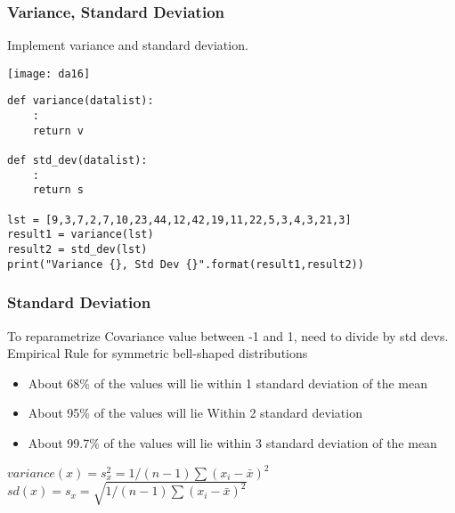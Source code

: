 \begin{frame}[fragile]\frametitle{Variance, Standard Deviation}
Implement variance and standard deviation.
\begin{center}
\texttt{[image: da16]}
\end{center}

\begin{lstlisting}
def variance(datalist):
	:
	return v

def std_dev(datalist):
	:
	return s

lst = [9,3,7,2,7,10,23,44,12,42,19,11,22,5,3,4,3,21,3]
result1 = variance(lst)
result2 = std_dev(lst)
print("Variance {}, Std Dev {}".format(result1,result2))
\end{lstlisting}
\end{frame}


 


\begin{frame}[fragile]\frametitle{Standard Deviation}	
To reparametrize Covariance value between -1 and 1, need to divide by std devs. Empirical Rule for symmetric bell-shaped distributions
\begin{itemize}
\item About 68\% of the values will lie within 1 standard deviation of the mean
\item About 95\% of the values will lie Within 2 standard deviation 
\item About 99.7\% of the values will lie within 3 standard deviation of the mean
\end{itemize}
$variance(x) = s_x^2 = 1/(n-1)\sum (x_i - \bar{x})^2$
$sd(x) = s_x = \sqrt{1/(n-1)\sum (x_i - \bar{x})^2}$
\end{frame}

